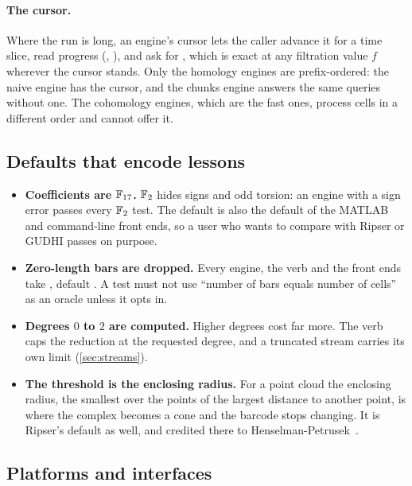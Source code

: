 \paragraph{The cursor.}
Where the run is long, an engine's cursor lets the caller advance it for a time slice, read progress
(, ), and ask for , which is exact at any filtration value $f$
wherever the cursor stands. Only the homology engines are prefix-ordered: the naive engine has the cursor, and the chunks
engine answers the same queries without one. The cohomology engines, which are the fast ones, process cells in a different
order and cannot offer it.

\subsection{Defaults that encode lessons}\label{sec:defaults}

\begin{itemize}[leftmargin=1.5em, itemsep=1pt]
\item \textbf{Coefficients are $\mathbb{F}_{17}$.} $\mathbb{F}_2$ hides signs and odd torsion: an engine with a sign error passes every
  $\mathbb{F}_2$ test. The default is also the default of the MATLAB and command-line front ends, so a user who wants to compare
  with Ripser or GUDHI passes  on purpose.
\item \textbf{Zero-length bars are dropped.} Every engine, the verb and the front ends take ,
  default . A test must not use ``number of bars equals number of cells'' as an oracle unless it opts in.
\item \textbf{Degrees $0$ to $2$ are computed.} Higher degrees cost far more. The verb caps the reduction at the requested
  degree, and a truncated stream carries its own limit (\cref{sec:streams}).
\item \textbf{The threshold is the enclosing radius.} For a point cloud the enclosing radius, the smallest over the points
  of the largest distance to another point, is where the complex becomes a cone and the barcode stops changing. It
  is Ripser's default as well, and credited there to Henselman-Petrusek~\cite{bauer2021ripser}.
\end{itemize}

\subsection{Platforms and interfaces}\label{sec:platforms}

